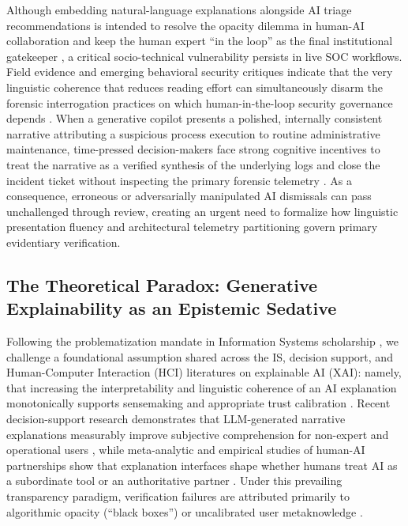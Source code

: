 \documentclass[11pt,a4paper]{article}
\begin{document}
Although embedding natural-language explanations alongside AI triage recommendations is intended to resolve the opacity dilemma in human-AI collaboration \citep{lebovitz2022engage, fugener2022cognitive, revilla2023human} and keep the human expert ``in the loop'' as the final institutional gatekeeper \citep{baird2021next, raisch2021artificial, ansari2026partner}, a critical socio-technical vulnerability persists in live SOC workflows. Field evidence and emerging behavioral security critiques indicate that the very linguistic coherence that reduces reading effort can simultaneously disarm the forensic interrogation practices on which human-in-the-loop security governance depends \citep{tilbury2024automation, bucinca2021trust, bag2025enhancing}. When a generative copilot presents a polished, internally consistent narrative attributing a suspicious process execution to routine administrative maintenance, time-pressed decision-makers face strong cognitive incentives to treat the narrative as a verified synthesis of the underlying logs and close the incident ticket without inspecting the primary forensic telemetry \citep{vasconcelos2023explanations, tariq2025alert, bartal2026alert}. As a consequence, erroneous or adversarially manipulated AI dismissals can pass unchallenged through review, creating an urgent need to formalize how linguistic presentation fluency and architectural telemetry partitioning govern primary evidentiary verification.

\subsection{The Theoretical Paradox: Generative Explainability as an Epistemic Sedative}
\label{subsec:paradox}

Following the problematization mandate in Information Systems scholarship \citep{chatterjee2020need, diaz2023indigenous}, we challenge a foundational assumption shared across the IS, decision support, and Human-Computer Interaction (HCI) literatures on explainable AI (XAI): namely, that increasing the interpretability and linguistic coherence of an AI explanation monotonically supports sensemaking and appropriate trust calibration \citep{burton2020systematic, jussupow2021augmenting, tutun2024explainable, bag2025enhancing, taudien2026effect}. Recent decision-support research demonstrates that LLM-generated narrative explanations measurably improve subjective comprehension for non-expert and operational users \citep{bag2025enhancing}, while meta-analytic and empirical studies of human-AI partnerships show that explanation interfaces shape whether humans treat AI as a subordinate tool or an authoritative partner \citep{ansari2026partner, revilla2023human, baird2021next, fugener2021will}. Under this prevailing transparency paradigm, verification failures are attributed primarily to algorithmic opacity (``black boxes'') or uncalibrated user metaknowledge \citep{lebovitz2022engage, fugener2022cognitive, tutun2024explainable}.
\end{document}
